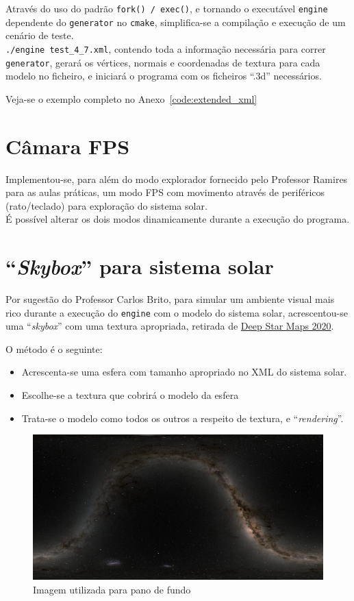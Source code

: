 \documentclass[11pt,a4paper]{report}%
\begin{document}
Através do uso do padrão \texttt{fork() / exec()}, e tornando o executável \texttt{engine}
dependente do \texttt{generator} no \texttt{cmake}, simplifica-se a compilação e execução de um cenário
de teste.
\\

\texttt{./engine test\_4\_7.xml}, contendo toda a informação necessária para correr \texttt{generator},
gerará os vértices, normais e coordenadas de textura para cada modelo no ficheiro, e iniciará o programa
com os ficheiros ``.3d'' necessários.

Veja-se o exemplo completo no Anexo~\ref{code:extended_xml}

\section{Câmara FPS}

Implementou-se, para além do modo explorador fornecido pelo Professor Ramires
para as aulas práticas, um modo FPS com movimento através de periféricos (rato/teclado) para exploração
do sistema solar.\\

É possível alterar os dois modos dinamicamente durante a execução do programa.

\section{``\textit{Skybox}'' para sistema solar}

Por sugestão do Professor Carlos Brito, para simular um ambiente visual mais rico durante a execução
do \texttt{engine} com o modelo do sistema solar, acrescentou-se uma ``\textit{skybox}'' com uma textura
apropriada, retirada de \href{https://svs.gsfc.nasa.gov/4851}{Deep Star Maps 2020}.

O método é o seguinte:

\begin{itemize}
  \item Acrescenta-se uma esfera com tamanho apropriado no XML do sistema solar.
  \item Escolhe-se a textura que cobrirá o modelo da esfera
  \item Trata-se o modelo como todos os outros a respeito de textura, e ``\textit{rendering}''.
\end{itemize}

\begin{figure}[H]
  \centering
  \includegraphics[scale=0.4]{galaxy.jpg}
  \caption{Imagem utilizada para pano de fundo}
  \label{fig:galaxy}
\end{figure}
\end{document}
